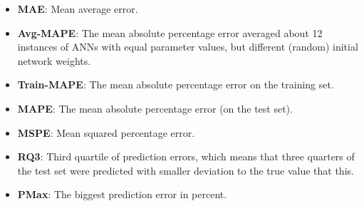 \documentclass{superfri}
\begin{document}
\begin{itemize}
	\item \textbf{MAE}: Mean average error.
	\item \textbf{Avg-MAPE}: The mean absolute percentage error averaged about 12 instances of ANNs with equal parameter values, but different (random) initial network weights.
	\item \textbf{Train-MAPE}: The mean absolute percentage error on the training set. 
	\item \textbf{MAPE}: The mean absolute percentage error (on the test set).
	\item \textbf{MSPE}: Mean squared percentage error.
	\item \textbf{RQ3}: Third quartile of prediction errors, which means that three quarters of the test set were predicted with smaller deviation to the true value that this.
	\item \textbf{PMax}: The biggest prediction error in percent.
\end{itemize}
\end{document}
